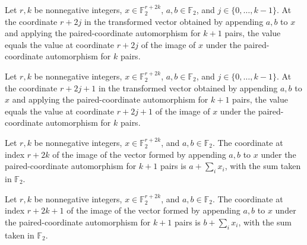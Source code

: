 \begin{theorem}
\label{FABL.pairedCoordinateEquiv_succ_left_castSucc}
\leanok
{}
Let $r,k$ be nonnegative integers, $x\in\mathbb{F}_2^{r+2k}$, $a,b\in\mathbb{F}_2$, and
$j\in\{0,\ldots,k-1\}$. At the coordinate $r+2j$ in the transformed vector obtained by
appending $a,b$ to $x$ and applying the paired-coordinate automorphism for $k+1$ pairs,
the value equals the value at coordinate $r+2j$ of the image of $x$ under the
paired-coordinate automorphism for $k$ pairs.
\end{theorem}

\begin{theorem}
\label{FABL.pairedCoordinateEquiv_succ_right_castSucc}
\leanok
{}
Let $r,k$ be nonnegative integers, $x\in\mathbb{F}_2^{r+2k}$, $a,b\in\mathbb{F}_2$, and
$j\in\{0,\ldots,k-1\}$. At the coordinate $r+2j+1$ in the transformed vector obtained by
appending $a,b$ to $x$ and applying the paired-coordinate automorphism for $k+1$ pairs,
the value equals the value at coordinate $r+2j+1$ of the image of $x$ under the
paired-coordinate automorphism for $k$ pairs.
\end{theorem}

\begin{theorem}
\label{FABL.pairedCoordinateEquiv_succ_left_last}
\leanok
{}
Let $r,k$ be nonnegative integers, $x\in\mathbb{F}_2^{r+2k}$, and $a,b\in\mathbb{F}_2$.
The coordinate at index $r+2k$ of the image of the vector formed by appending $a,b$ to
$x$ under the paired-coordinate automorphism for $k+1$ pairs is $a+\sum_i x_i$, with the
sum taken in $\mathbb{F}_2$.
\end{theorem}

\begin{theorem}
\label{FABL.pairedCoordinateEquiv_succ_right_last}
\leanok
{}
Let $r,k$ be nonnegative integers, $x\in\mathbb{F}_2^{r+2k}$, and $a,b\in\mathbb{F}_2$.
The coordinate at index $r+2k+1$ of the image of the vector formed by appending $a,b$ to
$x$ under the paired-coordinate automorphism for $k+1$ pairs is $b+\sum_i x_i$, with the
sum taken in $\mathbb{F}_2$.
\end{theorem}

